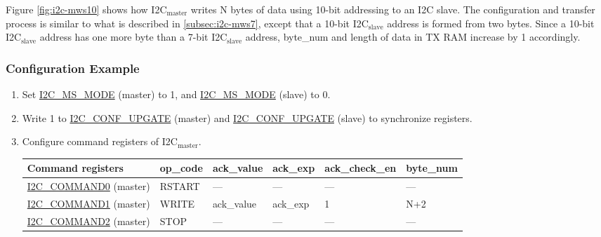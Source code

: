 \documentclass[main\_\_EN.tex]{subfiles}
\begin{document}
Figure \ref{fig:i2c-mws10} shows how I2C$_\text{master}$ writes N bytes of data using 10-bit addressing to an I2C slave. The configuration and transfer process is similar to what is described in \ref{subsec:i2c-mws7}, except that a 10-bit I2C$_\text{slave}$ address is formed from two bytes. Since a 10-bit I2C$_\text{slave}$ address has one more byte than a 7-bit I2C$_\text{slave}$ address, byte\_num and length of data in TX RAM increase by 1 accordingly.

\subsubsection{Configuration Example}
\begin{enumerate}
\item Set \hyperref[fielddesc:I2CMSMODE]{I2C\_MS\_MODE} (master) to 1, and \hyperref[fielddesc:I2CMSMODE]{I2C\_MS\_MODE} (slave) to 0.
\item Write 1 to \hyperref[fielddesc:I2CCONFUPGATE]{I2C\_CONF\_UPGATE} (master) and \hyperref[fielddesc:I2CCONFUPGATE]{I2C\_CONF\_UPGATE} (slave) to synchronize registers.
\item Configure command registers of I2C$_\text{master}$.

\begin{longtable}{ | p{4cm} | p{2cm} | p{2cm} | p{2cm} |p{2cm} | p{2cm} |}
\hline\rowcolor{lightgray}
Command registers& op\_code & ack\_value&ack\_exp&ack\_check\_en&byte\_num  \\ \hline
\hyperref[fielddesc:I2CCOMMAND0]{I2C\_COMMAND0} (master)& RSTART& ---&---&---&---  \\ \hline
\hyperref[fielddesc:I2CCOMMAND1]{I2C\_COMMAND1} (master)& WRITE& ack\_value&ack\_exp&1&N+2  \\ \hline
\hyperref[fielddesc:I2CCOMMAND2]{I2C\_COMMAND2} (master)& STOP& ---&---&---&---  \\ \hline
\end{longtable}


\end{enumerate}
\end{document}

